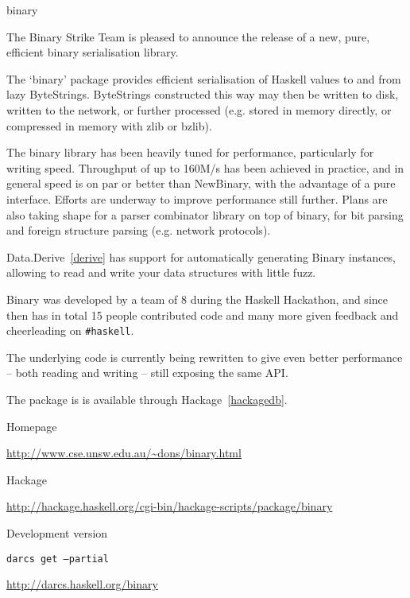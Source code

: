 \begin{hcarentry}{binary}
\label{binary}
\makeheader

The Binary Strike Team is pleased to announce the release of a new,
pure, efficient binary serialisation library.

The `binary' package provides efficient serialisation of Haskell values
to and from lazy ByteStrings. ByteStrings constructed this way may then
be written to disk, written to the network, or further processed (e.g.
stored in memory directly, or compressed in memory with zlib or bzlib).

The binary library has been heavily tuned for performance, particularly for
writing speed. Throughput of up to 160M/s has been achieved in practice, and
in general speed is on par or better than NewBinary, with the advantage of a
pure interface. Efforts are underway to improve performance still further.
Plans are also taking shape for a parser combinator library on top of
binary, for bit parsing and foreign structure parsing (e.g. network
protocols).

Data.Derive~\cref{derive} has support for automatically generating Binary
instances, allowing to read and write your data structures with little fuzz.

Binary was developed by a team of 8 during the Haskell Hackathon, and since
then has in total 15 people contributed code and many more given feedback
and cheerleading on \verb|#haskell|.

The underlying code is currently being rewritten to give even better
performance -- both reading and writing -- still exposing the same API.

The package is is available through Hackage~\cref{hackagedb}.

\FurtherReading
\begin{compactitem}
\item Homepage

  \url{http://www.cse.unsw.edu.au/~dons/binary.html}
\item Hackage

  \url{http://hackage.haskell.org/cgi-bin/hackage-scripts/package/binary}
\item Development version

  \texttt{darcs get --partial}

  \url{http://darcs.haskell.org/binary}
\end{compactitem}
\end{hcarentry}
